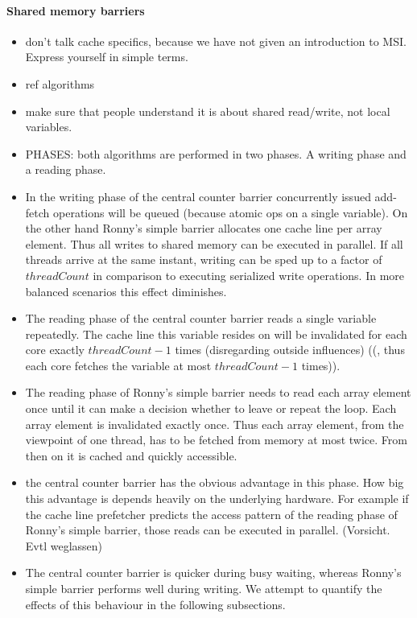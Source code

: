 \documentclass[a4paper, 10pt]{article}
\begin{document}
\paragraph{Shared memory barriers}
\label{sssec:analysis-general-shared}
\begin{itemize}
	\item don't talk cache specifics, because we have not given an introduction to MSI. Express yourself in simple terms.
	\item ref algorithms
	\item make sure that people understand it is about shared read/write, not local variables.
	\item PHASES: both algorithms are performed in two phases. A writing phase and a reading phase.
	\item In the writing phase of the central counter barrier concurrently issued add-fetch operations will be queued (because atomic ops on a single variable). On the other hand Ronny's simple barrier allocates one cache line per array element. Thus all writes to shared memory can be executed in parallel. If all threads arrive at the same instant, writing can be sped up to a factor of $\mathit{threadCount}$ in comparison to executing serialized write operations. In more balanced scenarios this effect diminishes.
	\item The reading phase of the central counter barrier reads a single variable repeatedly. The cache line this variable resides on will be invalidated for each core exactly $\mathit{threadCount} - 1$ times (disregarding outside influences) ((, thus each core fetches the variable at most $\mathit{threadCount} - 1$ times)).
	\item The reading phase of Ronny's simple barrier needs to read each array element once until it can make a decision whether to leave or repeat the loop. Each array element is invalidated exactly once. Thus each array element, from the viewpoint of one thread, has to be fetched from memory at most twice. From then on it is cached and quickly accessible.
	\item the central counter barrier has the obvious advantage in this phase. How big this advantage is depends heavily on the underlying hardware. For example if the cache line prefetcher predicts the access pattern of the reading phase of Ronny's simple barrier, those reads can be executed in parallel. (Vorsicht. Evtl weglassen)
	\item The central counter barrier is quicker during busy waiting, whereas Ronny's simple barrier performs well during writing. We attempt to quantify the effects of this behaviour in the following subsections.

\end{itemize}
\end{document}
